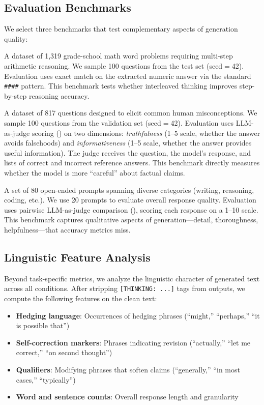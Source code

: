 \subsection{Evaluation Benchmarks}
\label{sec:benchmarks}

We select three benchmarks that test complementary aspects of generation quality:

 A dataset of 1,319 grade-school math word problems requiring multi-step arithmetic reasoning. We sample 100 questions from the test set (seed$=$42). Evaluation uses exact match on the extracted numeric answer via the standard \texttt{\#\#\#\#} pattern. This benchmark tests whether interleaved thinking improves step-by-step reasoning accuracy.

 A dataset of 817 questions designed to elicit common human misconceptions. We sample 100 questions from the validation set (seed$=$42). Evaluation uses LLM-as-judge scoring (\gptfour) on two dimensions: \emph{truthfulness} (1--5 scale, whether the answer avoids falsehoods) and \emph{informativeness} (1--5 scale, whether the answer provides useful information). The judge receives the question, the model's response, and lists of correct and incorrect reference answers. This benchmark directly measures whether the model is more ``careful'' about factual claims.

 A set of 80 open-ended prompts spanning diverse categories (writing, reasoning, coding, etc.). We use 20 prompts to evaluate overall response quality. Evaluation uses pairwise LLM-as-judge comparison (\gptfour), scoring each response on a 1--10 scale. This benchmark captures qualitative aspects of generation---detail, thoroughness, helpfulness---that accuracy metrics miss.

\subsection{Linguistic Feature Analysis}
\label{sec:linguistic}

Beyond task-specific metrics, we analyze the linguistic character of generated text across all conditions. After stripping \texttt{[THINKING: ...]} tags from \sentthink outputs, we compute the following features on the clean text:

\begin{itemize}[leftmargin=*,itemsep=0pt,topsep=0pt]
    \item \textbf{Hedging language}: Occurrences of hedging phrases (\eg ``might,'' ``perhaps,'' ``it is possible that'')
    \item \textbf{Self-correction markers}: Phrases indicating revision (\eg ``actually,'' ``let me correct,'' ``on second thought'')
    \item \textbf{Qualifiers}: Modifying phrases that soften claims (\eg ``generally,'' ``in most cases,'' ``typically'')
    \item \textbf{Word and sentence counts}: Overall response length and granularity
\end{itemize}

